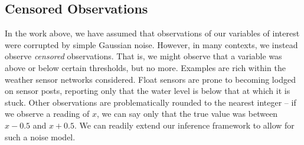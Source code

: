 \documentclass{acmtrans2m}
\begin{document}
\subsection{Censored Observations}\label{sec:censored}

In the work above, we have assumed that observations of our variables of interest were corrupted by simple Gaussian noise. However, in many contexts, we instead observe \emph{censored} observations. That is, we might observe that a variable was above or below certain thresholds, but no more. Examples are rich within the weather sensor networks considered. Float sensors are prone to becoming lodged on sensor posts, reporting only that the water level is below that at which it is stuck. Other observations are problematically rounded to the nearest integer -- if we observe a reading of $x$, we can say only that the true value was between $x-0.5$ and $x+0.5$. We can readily extend our inference framework to allow for such a noise model. 
\end{document}
